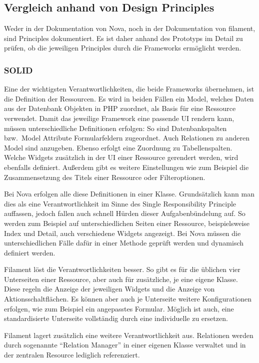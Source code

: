 \subsection{Vergleich anhand von Design Principles}
Weder in der Dokumentation von Nova, noch in der Dokumentation von filament, sind Principles dokumentiert.
Es ist daher anhand des Prototyps im Detail zu prüfen, ob die jeweiligen Principles durch die Frameworks ermöglicht werden.

\subsubsection{SOLID}
Eine der wichtigsten Verantwortlichkeiten, die beide Frameworks übernehmen, ist die Definition der Ressourcen.
Es wird in beiden Fällen ein Model, welches Daten aus der Datenbank Objekten in PHP zuordnet, als Basis für eine Ressource verwendet.
Damit das jeweilige Framework eine passende UI rendern kann, müssen unterschiedliche Definitionen erfolgen:
So sind Datenbankspalten bzw.\ Model Attribute Formularfeldern zugeordnet.
Auch Relationen zu anderen Model sind anzugeben.
Ebenso erfolgt eine Zuordnung zu Tabellenspalten.
Welche Widgets zusätzlich in der UI einer Ressource gerendert werden, wird ebenfalls definiert.
Außerdem gibt es weitere Einstellungen wie zum Beispiel die Zusammensetzung des Titels einer Ressource oder Filteroptionen.

Bei Nova erfolgen alle diese Definitionen in einer Klasse.
Grundsätzlich kann man dies als eine Verantwortlichkeit im Sinne des Single Responsibility Principle auffassen, jedoch fallen auch schnell Hürden dieser Aufgabenbündelung auf.
So werden zum Beispiel auf unterschiedlichen Seiten einer Ressource, beispielsweise Index und Detail, auch verschiedene Widgets angezeigt.
Bei Nova müssen die unterschiedlichen Fälle dafür in einer Methode geprüft werden und dynamisch definiert werden.

Filament löst die Verantwortlichkeiten besser.
So gibt es für die üblichen vier Unterseiten einer Ressource, aber auch für zusätzliche, je eine eigene Klasse.
Diese regeln die Anzeige der jeweiligen Widgets und die Anzeige von Aktionsschaltflächen.
Es können aber auch je Unterseite weitere Konfigurationen erfolgen, wie zum Beispiel ein angepasstes Formular.
Möglich ist auch, eine standardisierte Unterseite vollständig durch eine individuelle zu ersetzen.

Filament lagert zusätzlich eine weitere Verantwortlichkeit aus.
Relationen werden durch sogenannte \enquote{Relation Manager} in einer eigenen Klasse verwaltet und in der zentralen Resource lediglich referenziert.

